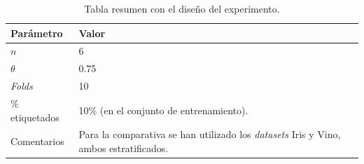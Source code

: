 \begin{table}
	\begin{centering}
		\begin{tabular}{@{}p{10em} p{20em} @{}}
			\toprule
			\textbf{Parámetro} & \textbf{Valor} \\ 
			\midrule
			$n$ & 6\\
			$\theta$ & 0.75 \\
			\textit{Folds} & 10 \\
			\% etiquetados & 10\% (en el conjunto de entrenamiento). \\
			Comentarios & Para la comparativa se han utilizado los \textit{datasets} Iris y Vino, ambos estratificados.\\
			\bottomrule
			
		\end{tabular}
	\end{centering}
	\caption[\textit{Co-forest}: resumen del experimento]{Tabla resumen con el diseño del experimento.}
	\label{tabla_coforest_keelvsnuestro_diseño}	
\end{table}

